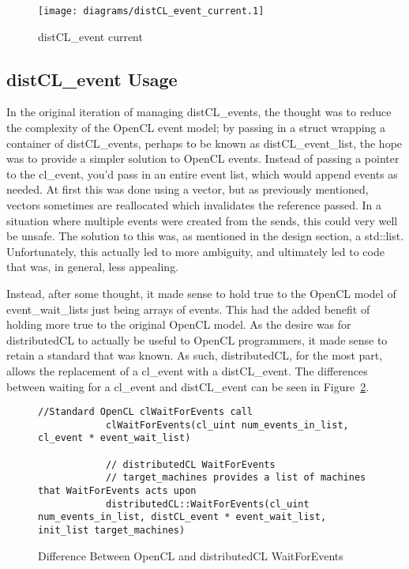 \documentclass[../thesis.tex]{subfiles}
\begin{document}
            \begin{figure}[htbp]
                \centering
                \texttt{[image: diagrams/distCL\_event\_current.1]}
                \caption{distCL\_event current}
                \label{fig:distCL_event_uml_current}
            \end{figure}


    \subsection{distCL\_event Usage} %
    \label{sub:distcl_event_usage}
        In the original iteration of managing distCL\_events, the thought was to reduce the complexity of the OpenCL event model; by passing in a struct wrapping a container of distCL\_events, perhaps to be known as distCL\_event\_list, the hope was to provide a simpler solution to OpenCL events. Instead of passing a pointer to the cl\_event, you'd pass in an entire event list, which would append events as needed. At first this was done using a vector, but as previously mentioned, vectors sometimes are reallocated which invalidates the reference passed. In a situation where multiple events were created from the sends, this could very well be unsafe. The solution to this was, as mentioned in the design section, a std::list. Unfortunately, this actually led to more ambiguity, and ultimately led to code that was, in general, less appealing.

        Instead, after some thought, it made sense to hold true to the OpenCL model of event\_wait\_lists just being arrays of events. This had the added benefit of holding more true to the original OpenCL model. As the desire was for distributedCL to actually be useful to OpenCL programmers, it made sense to retain a standard that was known. As such, distributedCL, for the most part, allows the replacement of a cl\_event with a distCL\_event. The differences between waiting for a cl\_event and distCL\_event can be seen in Figure~\ref{fig:difference_between_wait_cl_and_wait_distCL}.

        \begin{figure}[htbp]
            \centering
            \lstset{language=cpp}
            \begin{lstlisting}[tabsize=2]
            //Standard OpenCL clWaitForEvents call
            clWaitForEvents(cl_uint num_events_in_list, cl_event * event_wait_list)
            
            // distributedCL WaitForEvents
            // target_machines provides a list of machines that WaitForEvents acts upon
            distributedCL::WaitForEvents(cl_uint num_events_in_list, distCL_event * event_wait_list, init_list target_machines)
            \end{lstlisting}
            \caption{Difference Between OpenCL and distributedCL WaitForEvents}
            \label{fig:difference_between_wait_cl_and_wait_distCL}
        \end{figure}
\end{document}
